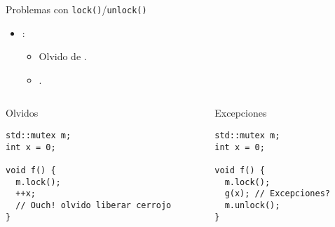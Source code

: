 \begin{frame}[t,fragile]{Problemas con \texttt{lock()}/\texttt{unlock()}}
\begin{itemize}
  \item {}:
    \begin{itemize}
      \item Olvido de .
      \item {}.
    \end{itemize}
\end{itemize}

\begin{columns}[T]
\begin{column}{.5\textwidth}
\begin{block}{Olvidos}
\begin{lstlisting}
std::mutex m;
int x = 0;

void f() {
  m.lock();
  ++x;
  // Ouch! olvido liberar cerrojo
}
\end{lstlisting}
\end{block}
\end{column}


\begin{column}{.5\textwidth}
\begin{block}{Excepciones}
\begin{lstlisting}
std::mutex m;
int x = 0;

void f() {
  m.lock();
  g(x); // Excepciones?
  m.unlock();
}
\end{lstlisting}
\end{block}
\end{column}
\end{columns}
\end{frame}

